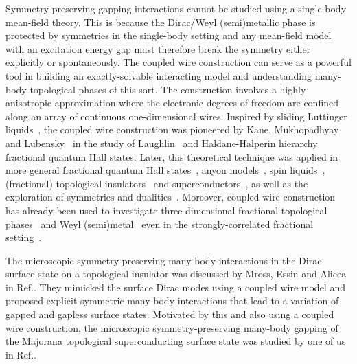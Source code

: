 Symmetry-preserving gapping interactions cannot be studied using a single-body mean-field theory. This is because the Dirac/Weyl (semi)metallic phase is protected by symmetries in the single-body setting and any mean-field model with an excitation energy gap must therefore break the symmetry either explicitly or spontaneously. The coupled wire construction can serve as a powerful tool in building an exactly-solvable interacting model and understanding many-body topological phases of this sort. The construction involves a highly anisotropic approximation where the electronic degrees of freedom are confined along an array of continuous one-dimensional wires. Inspired by sliding Luttinger liquids~\cite{OHernLubenskyToner99,EmeryFradkinKivelsonLubensky00,VishwanathCarpentier01,SondhiYang01,MukhopadhyayKaneLubensky01}, the coupled wire construction was pioneered by Kane, Mukhopadhyay and Lubensky~\cite{KaneMukhopadhyayLubensky02} in the study of Laughlin~\cite{Laughlin83} and Haldane-Halperin hierarchy~\cite{Haldane83,Halperin84} fractional quantum Hall states. Later, this theoretical technique was applied in more general fractional quantum Hall states~\cite{TeoKaneCouplewires,KlinovajaLoss14,MengStanoKlinovajaLoss14,SagiOregSternHalperin15,KaneSternHalperin17}, anyon models~\cite{OregSelaStern14,StoudenmireClarkeMongAlicea15}, spin liquids~\cite{MengNeupertGreiterThomale15,GorohovskyPereiraSela15}, (fractional) topological insulators~\cite{NeupertChamonMudryThomale14,KlinovajaTserkovnyak14,SagiOreg14,SagiOreg15,SantosHuangGefenGutman15} and superconductors~\cite{mongg2,SeroussiBergOreg14}, as well as the exploration of symmetries and dualities~\cite{MrossAliceaMotrunich16,MrossAliceaMotrunich17}. Moreover, coupled wire construction has already been used to investigate three dimensional fractional topological phases~\cite{Meng15} and Weyl (semi)metal~\cite{Vazifeh13} even in the strongly-correlated fractional setting~\cite{MengGrushinShtengelBardarson16}.

The microscopic symmetry-preserving many-body interactions in the Dirac surface state on a topological insulator was discussed by Mross, Essin and Alicea in Ref.. They mimicked the surface Dirac modes using a coupled wire model and proposed explicit symmetric many-body interactions that lead to a variation of gapped and gapless surface states. Motivated by this and also using a coupled wire construction, the microscopic symmetry-preserving many-body gapping of the Majorana topological superconducting surface state was studied by one of us in Ref.. 

